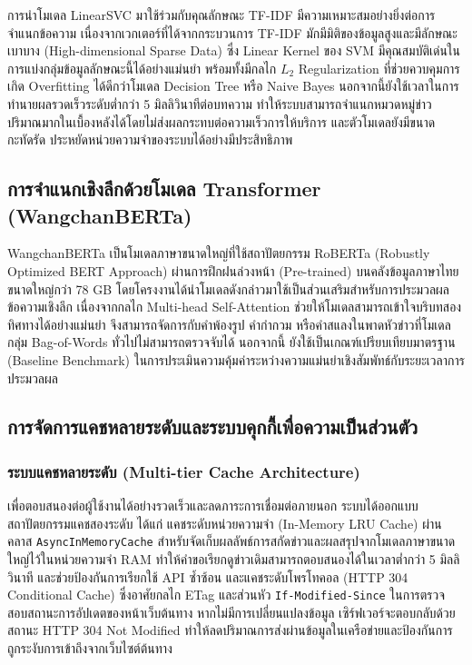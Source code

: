 การนำโมเดล LinearSVC มาใช้ร่วมกับคุณลักษณะ TF-IDF มีความเหมาะสมอย่างยิ่งต่อการจำแนกข้อความ เนื่องจากเวกเตอร์ที่ได้จากกระบวนการ TF-IDF มักมีมิติของข้อมูลสูงและมีลักษณะเบาบาง (High-dimensional Sparse Data) ซึ่ง Linear Kernel ของ SVM มีคุณสมบัติเด่นในการแบ่งกลุ่มข้อมูลลักษณะนี้ได้อย่างแม่นยำ พร้อมทั้งมีกลไก $L_2$ Regularization ที่ช่วยควบคุมการเกิด Overfitting ได้ดีกว่าโมเดล Decision Tree หรือ Naive Bayes นอกจากนี้ยังใช้เวลาในการทำนายผลรวดเร็วระดับต่ำกว่า 5 มิลลิวินาทีต่อบทความ ทำให้ระบบสามารถจำแนกหมวดหมู่ข่าวปริมาณมากในเบื้องหลังได้โดยไม่ส่งผลกระทบต่อความเร็วการให้บริการ และตัวโมเดลยังมีขนาดกะทัดรัด ประหยัดหน่วยความจำของระบบได้อย่างมีประสิทธิภาพ

\subsection{การจำแนกเชิงลึกด้วยโมเดล Transformer (WangchanBERTa)}

WangchanBERTa \cite{wangchanberta2021} เป็นโมเดลภาษาขนาดใหญ่ที่ใช้สถาปัตยกรรม RoBERTa (Robustly Optimized BERT Approach) ผ่านการฝึกฝนล่วงหน้า (Pre-trained) บนคลังข้อมูลภาษาไทยขนาดใหญ่กว่า 78 GB โดยโครงงานได้นำโมเดลดังกล่าวมาใช้เป็นส่วนเสริมสำหรับการประมวลผลข้อความเชิงลึก เนื่องจากกลไก Multi-head Self-Attention ช่วยให้โมเดลสามารถเข้าใจบริบทสองทิศทางได้อย่างแม่นยำ จึงสามารถจัดการกับคำพ้องรูป คำกำกวม หรือคำสแลงในพาดหัวข่าวที่โมเดลกลุ่ม Bag-of-Words ทั่วไปไม่สามารถตรวจจับได้ นอกจากนี้ ยังใช้เป็นเกณฑ์เปรียบเทียบมาตรฐาน (Baseline Benchmark) ในการประเมินความคุ้มค่าระหว่างความแม่นยำเชิงสัมพัทธ์กับระยะเวลาการประมวลผล

\subsection{การจัดการแคชหลายระดับและระบบคุกกี้เพื่อความเป็นส่วนตัว}

\subsubsection{ระบบแคชหลายระดับ (Multi-tier Cache Architecture)}
เพื่อตอบสนองต่อผู้ใช้งานได้อย่างรวดเร็วและลดภาระการเชื่อมต่อภายนอก ระบบได้ออกแบบสถาปัตยกรรมแคชสองระดับ ได้แก่ แคชระดับหน่วยความจำ (In-Memory LRU Cache) ผ่านคลาส \texttt{AsyncInMemoryCache} สำหรับจัดเก็บผลลัพธ์การสกัดข่าวและผลสรุปจากโมเดลภาษาขนาดใหญ่ไว้ในหน่วยความจำ RAM ทำให้คำขอเรียกดูข่าวเดิมสามารถตอบสนองได้ในเวลาต่ำกว่า 5 มิลลิวินาที และช่วยป้องกันการเรียกใช้ API ซ้ำซ้อน และแคชระดับโพรโทคอล (HTTP 304 Conditional Cache) ซึ่งอาศัยกลไก ETag และส่วนหัว \texttt{If-Modified-Since} ในการตรวจสอบสถานะการอัปเดตของหน้าเว็บต้นทาง หากไม่มีการเปลี่ยนแปลงข้อมูล เซิร์ฟเวอร์จะตอบกลับด้วยสถานะ HTTP 304 Not Modified ทำให้ลดปริมาณการส่งผ่านข้อมูลในเครือข่ายและป้องกันการถูกระงับการเข้าถึงจากเว็บไซต์ต้นทาง

